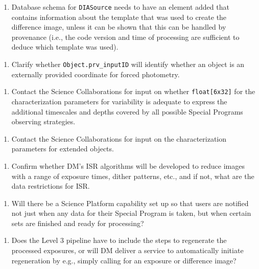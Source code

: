 \documentclass[DM,lsstdraft,toc]{lsstdoc}
\begin{document}
\begin{enumerate}[resume,topsep=-10pt,label= \textbf{Concern \Roman*.}] \item \label{C8} Database schema for {\tt DIASource} needs to have an element added that contains information about the template that was used to create the difference image, unless it can be shown that this can be handled by provenance (i.e., the code version and time of processing are sufficient to deduce which template was used). \end{enumerate}
\begin{enumerate}[resume,topsep=-10pt,label= \textbf{Concern \Roman*.}] \item \label{C9} Clarify whether {\tt Object.prv\_inputID} will identify whether an object is an externally provided coordinate for forced photometry. \end{enumerate}
\begin{enumerate}[resume,topsep=-10pt,label= \textbf{Concern \Roman*.}] \item \label{C10} Contact the Science Collaborations for input on whether {\tt float[6x32]} for the characterization parameters for variability is adequate to express the additional timescales and depths covered by all possible Special Programs observing strategies. \end{enumerate}
\begin{enumerate}[resume,topsep=-10pt,label= \textbf{Concern \Roman*.}] \item \label{C11} Contact the Science Collaborations for input on the characterization parameters for extended objects. \end{enumerate}
\begin{enumerate}[resume,topsep=-10pt,label= \textbf{Concern \Roman*.}] \item \label{C12} Confirm whether DM's ISR algorithms will be developed to reduce images with a range of exposure times, dither patterns, etc., and if not, what are the data restrictions for ISR. \end{enumerate}
\begin{enumerate}[resume,topsep=-10pt,label= \textbf{Concern \Roman*.}] \item \label{C13} Will there be a Science Platform capability set up so that users are notified not just when any data for their Special Program is taken, but when certain sets are finished and ready for processing? \end{enumerate}
\begin{enumerate}[resume,topsep=-10pt,label= \textbf{Concern \Roman*.}] \item \label{C14} Does the Level 3 pipeline have to include the steps to regenerate the processed exposures, or will DM deliver a service to automatically initiate regeneration by e.g., simply calling for an exposure or difference image? \end{enumerate}
\end{document}
